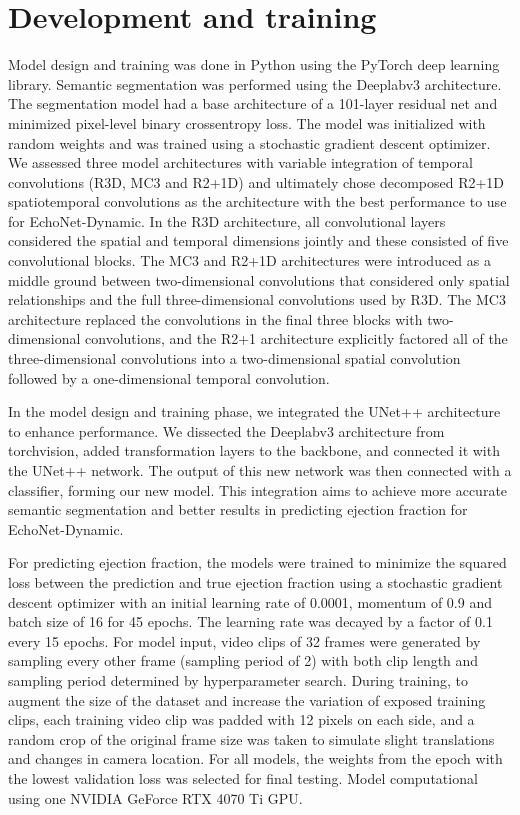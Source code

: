 \vfill
\section{Development and training}

Model design and training was done in Python using the PyTorch deep learning library. Semantic segmentation was performed using the Deeplabv3 architecture. The segmentation model had a base architecture of a 101-layer residual net and minimized pixel-level binary crossentropy loss. The model was initialized with random weights and was trained using a stochastic gradient descent optimizer. We assessed three model architectures with variable integration of temporal convolutions (R3D, MC3 and R2+1D) and ultimately chose decomposed R2+1D spatiotemporal convolutions as the architecture with the best performance to use for EchoNet-Dynamic. In the R3D architecture, all convolutional layers considered the spatial and temporal dimensions jointly and these consisted of five convolutional blocks. The MC3 and R2+1D architectures were introduced as a middle ground between two-dimensional convolutions that considered only spatial relationships and the full three-dimensional convolutions used by R3D. The MC3 architecture replaced the convolutions in the final three blocks with two-dimensional convolutions, and the R2+1 architecture explicitly factored all of the three-dimensional convolutions into a two-dimensional spatial convolution followed by a one-dimensional temporal convolution.

In the model design and training phase, we integrated the UNet++ architecture to enhance performance. We dissected the Deeplabv3 architecture from torchvision, added transformation layers to the backbone, and connected it with the UNet++ network. The output of this new network was then connected with a classifier, forming our new model. This integration aims to achieve more accurate semantic segmentation and better results in predicting ejection fraction for EchoNet-Dynamic.

For predicting ejection fraction, the models were trained to minimize the squared loss between the prediction and true ejection fraction using a stochastic gradient descent optimizer with an initial learning rate of 0.0001, momentum of 0.9 and batch size of 16 for 45 epochs. The learning rate was decayed by a factor of 0.1 every 15 epochs. For model input, video clips of 32 frames were generated by sampling every other frame (sampling period of 2) with both clip length and sampling period determined by hyperparameter search. During training, to augment the size of the dataset and increase the variation of exposed training clips, each training video clip was padded with 12 pixels on each side, and a random crop of the original frame size was taken to simulate slight translations and changes in camera location. For all models, the weights from the epoch with the lowest validation loss was selected for final testing. Model computational using one NVIDIA GeForce RTX 4070 Ti GPU.

